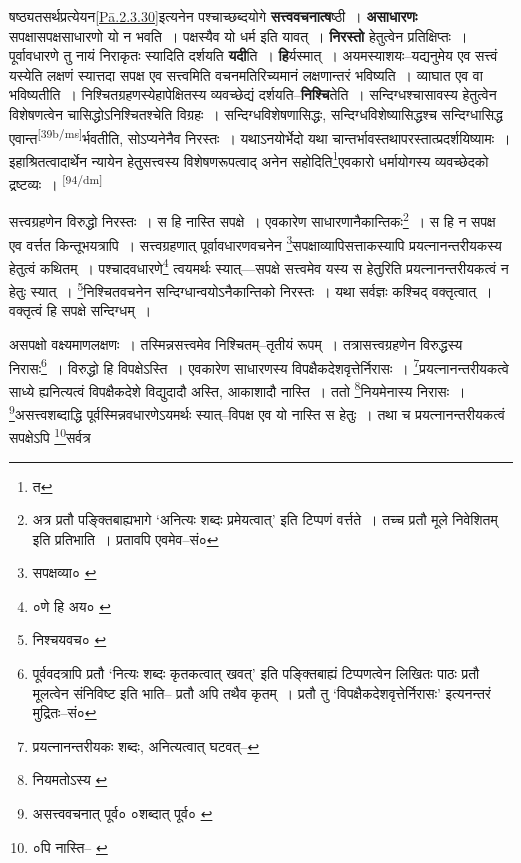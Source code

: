 \documentclass[article,12pt,a4paper]{memoir}
\begin{document}
	  \pstart षष्ठ्यतसर्थप्रत्येयन\cref{Pā.2.3.30}इत्यनेन पश्चाच्छब्दयोगे \textbf{सत्त्ववचनात्ष}ष्ठी । \textbf{असाधारणः} सपक्षासपक्षसाधारणो यो न भवति । पक्षस्यैव यो धर्म इति यावत् । \textbf{निरस्तो} हेतुत्वेन प्रतिक्षिप्तः । पूर्वावधारणे तु नायं निराकृतः स्यादिति दर्शयति \textbf{यदी}ति । \textbf{हि}र्यस्मात् । अयमस्याशयः--यद्यनुमेय एव सत्त्वं यस्येति लक्षणं स्यात्तदा सपक्ष एव सत्त्वमिति वचनमतिरिच्यमानं लक्षणान्तरं भविष्यति । व्याघात एव वा भविष्यतीति । निश्चितग्रहणस्येहापेक्षितस्य व्यवच्छेद्यं दर्शयति--\textbf{निश्चि}तेति । सन्दिग्धश्चासावस्य हेतुत्वेन विशेषणत्वेन चासिद्धोऽनिश्चितश्चेति विग्रहः । सन्दिग्धविशेषणासिद्धः, सन्दिग्धविशेष्यासिद्धश्च सन्दिग्धासिद्ध एवान्त\leavevmode\textsuperscript{\rmlatinfont\tiny [39b/ms]}र्भवतीति, सोऽप्यनेनैव निरस्तः । यथाऽनयोर्भेदो यथा चान्तर्भावस्तथापरस्तात्प्रदर्शयिष्यामः । इहाश्रितत्वादार्थेन न्यायेन हेतुसत्त्वस्य विशेषणरूपत्वाद् अनेन सहोदिति\footnote{त}एवकारो धर्मायोगस्य व्यवच्छेदको द्रष्टव्यः ।
	\pend
      \leavevmode\textsuperscript{\rmlatinfont\tiny [94/dm]}

	  \pstart सत्त्वग्रहणेन विरुद्धो निरस्तः । स हि नास्ति सपक्षे । एवकारेण साधारणानैकान्तिकः\footnote{अत्र \cite{dp-msD} प्रतौ पङ्क्तिबाह्यभागे ‘अनित्यः शब्दः प्रमेयत्वात्’ इति टिप्पणं वर्त्तते । तच्च \cite{dp-msB} प्रतौ मूले निवेशितम् इति प्रतिभाति । \cite{dp-edH} \cite{dp-edN} प्रतावपि एवमेव--सं०} । स हि न सपक्ष एव वर्त्तत किन्तूभयत्रापि । सत्त्वग्रहणात् पूर्वावधारणवचनेन \footnote{सपक्षव्या० \cite{dp-msB} \cite{dp-edH}}सपक्षाव्यापिसत्ताकस्यापि प्रयत्नानन्तरीयकस्य हेतुत्वं कथितम् । पश्चादवधारणे\footnote{०णे हि अय० \cite{dp-msA} \cite{dp-msC}} त्वयमर्थः स्यात्—सपक्षे सत्त्वमेव यस्य स हेतुरिति प्रयत्नानन्तरीयकत्वं न हेतुः स्यात् । \footnote{निश्चयवच० \cite{dp-msA}}निश्चितवचनेन सन्दिग्धान्वयोऽनैकान्तिको निरस्तः । यथा सर्वज्ञः कश्चिद् वक्तृत्वात् । वक्तृत्वं हि सपक्षे सन्दिग्धम् ।
	\pend
       

	  \pstart असपक्षो वक्ष्यमाणलक्षणः । तस्मिन्नसत्त्वमेव निश्चितम्--तृतीयं रूपम् । तत्रासत्त्वग्रहणेन विरुद्धस्य निरासः\footnote{पूर्ववदत्रापि \cite{dp-msD} प्रतौ ‘नित्यः शब्दः कृतकत्वात् खवत्’ इति पङ्क्तिबाह्यं टिप्पणत्वेन लिखितः पाठः \cite{dp-msB} प्रतौ मूलत्वेन संनिविष्ट इति भाति--\cite{dp-edN} प्रतौ अपि तथैव कृतम् । \cite{dp-edH} प्रतौ तु ‘विपक्षैकदेशवृत्तेर्निरासः’ इत्यनन्तरं मुद्रितः--सं०} । विरुद्धो हि विपक्षेऽस्ति । एवकारेण साधारणस्य विपक्षैकदेशवृत्तेर्निरासः । \footnote{प्रयत्नानन्तरीयकः शब्दः, अनित्यत्वात् घटवत्--\cite{dp-msD-n}}प्रयत्नानन्तरीयकत्वे साध्ये ह्यनित्यत्वं विपक्षैकदेशे विद्युदादौ अस्ति, आकाशादौ नास्ति । ततो \footnote{नियमतोऽस्य \cite{dp-msC}}नियमेनास्य निरासः । \footnote{असत्त्ववचनात् पूर्व० \cite{dp-msA} \cite{dp-edP} \cite{dp-edH} \cite{dp-edE} \cite{dp-edN} ०शब्दात् पूर्व० \cite{dp-msB} \cite{dp-msC} \cite{dp-msD}}असत्त्वशब्दाद्धि पूर्वस्मिन्नवधारणेऽयमर्थः स्यात्--विपक्ष एव यो नास्ति स हेतुः । तथा च प्रयत्नानन्तरीयकत्वं सपक्षेऽपि \footnote{०पि नास्ति--\cite{dp-msB} \cite{dp-edE}}सर्वत्र
	\pend
      
\end{document}
